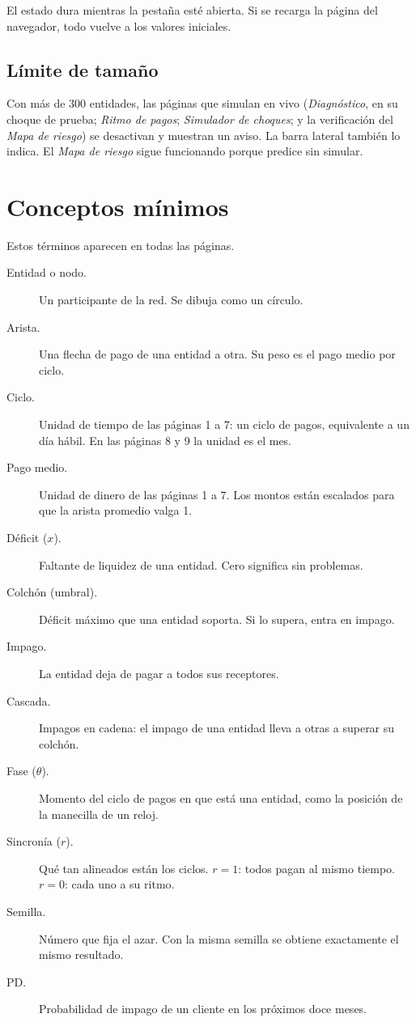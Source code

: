 El estado dura mientras la pestaña esté abierta. Si se recarga la página del navegador,
todo vuelve a los valores iniciales.

\subsection{Límite de tamaño}
Con más de 300 entidades, las páginas que simulan en vivo (\emph{Diagnóstico}, en su
choque de prueba; \emph{Ritmo de pagos}; \emph{Simulador de choques}; y la verificación
del \emph{Mapa de riesgo}) se desactivan y muestran un aviso. La barra lateral también lo
indica. El \emph{Mapa de riesgo} sigue funcionando porque predice sin simular.

\section{Conceptos mínimos}

Estos términos aparecen en todas las páginas.

\begin{description}
\item[Entidad o nodo.] Un participante de la red. Se dibuja como un círculo.
\item[Arista.] Una flecha de pago de una entidad a otra. Su peso es el pago medio por
ciclo.
\item[Ciclo.] Unidad de tiempo de las páginas 1 a 7: un ciclo de pagos, equivalente a un
día hábil. En las páginas 8 y 9 la unidad es el mes.
\item[Pago medio.] Unidad de dinero de las páginas 1 a 7. Los montos están escalados para
que la arista promedio valga 1.
\item[Déficit ($x$).] Faltante de liquidez de una entidad. Cero significa sin problemas.
\item[Colchón (umbral).] Déficit máximo que una entidad soporta. Si lo supera, entra en
impago.
\item[Impago.] La entidad deja de pagar a todos sus receptores.
\item[Cascada.] Impagos en cadena: el impago de una entidad lleva a otras a superar su
colchón.
\item[Fase ($\theta$).] Momento del ciclo de pagos en que está una entidad, como la
posición de la manecilla de un reloj.
\item[Sincronía ($r$).] Qué tan alineados están los ciclos. $r=1$: todos pagan al mismo
tiempo. $r=0$: cada uno a su ritmo.
\item[Semilla.] Número que fija el azar. Con la misma semilla se obtiene exactamente el
mismo resultado.
\item[PD.] Probabilidad de impago de un cliente en los próximos doce meses.
\end{description}
